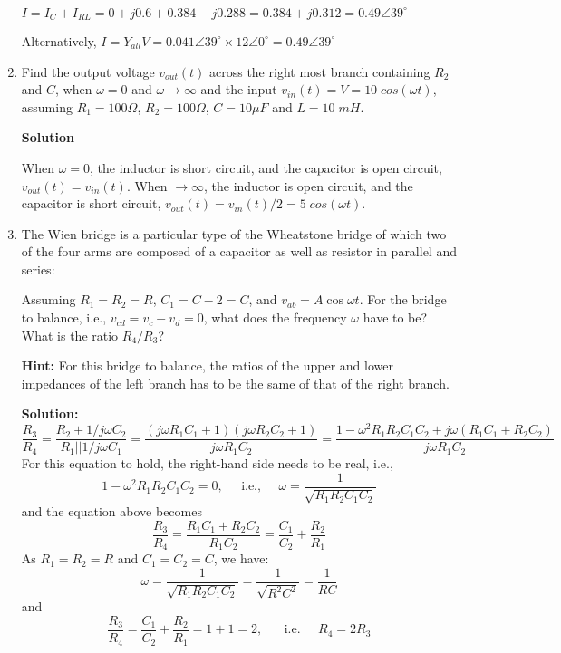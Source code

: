 \begin{enumerate}
$I=I_C+I_{RL}=0+j0.6+0.384-j0.288=0.384+j0.312=0.49\angle{39^\circ}$

Alternatively,
$I=Y_{all}V=0.041\angle{39^\circ} \times 12\angle{0^\circ}=0.49\angle{39^\circ}$


\item Find the output voltage $v_{out}(t)$ across the right most branch
containing $R_2$ and $C$, when $\omega=0$ and $\omega\rightarrow \infty$ 
and the input $v_{in}(t)=V=10\;cos(\omega t)$, assuming $R_1=100\Omega$, 
$R_2=100\Omega$, $C=10\mu F$ and $L=10\;mH$.


 {\bf Solution}
 
 When $\omega=0$, the inductor is short circuit, and the capacitor is open
 circuit, $v_{out}(t)=v_{in}(t)$. When $\rightarrow \infty$, the inductor is 
 open circuit, and the capacitor is  short circuit, $v_{out}(t)=v_{in}(t)/2=5
 \;cos(\omega t)$.

\item The Wien bridge is a particular type of the Wheatstone bridge 
  of which two of the four arms are composed of a capacitor as well 
  as resistor in parallel and series:


  Assuming $R_1=R_2=R$, $C_1=C-2=C$, and $v_{ab}=A\cos\omega t$. For the
  bridge to balance, i.e., $v_{cd}=v_c-v_d=0$, what does the frequency 
  $\omega$ have to be? What is the ratio $R_4/R_3$?

  {\bf Hint:} For this bridge to balance, the ratios of the upper and
  lower impedances of the left branch has to be the same of that of
  the right branch.

 {\bf Solution:}
 \[
 \frac{R_3}{R_4}=\frac{R_2+1/j\omega C_2}{R_1||1/j\omega C_1}
 =\frac{(j\omega R_1C_1+1)(j\omega R_2C_2+1)}{j\omega R_1C_2}
 =\frac{1-\omega^2R_1R_2C_1C_2+j\omega(R_1C_1+R_2C_2)}{j\omega R_1C_2}
 \]
 For this equation to hold, the right-hand side needs to be real, i.e., 
 \[
 1-\omega^2R_1R_2C_1C_2=0,\;\;\;\;\;\mbox{i.e.,}\;\;\;\;\;
 \omega=\frac{1}{\sqrt{R_1R_2C_1C_2}}
 \]
 and the equation above becomes 
 \[
 \frac{R_3}{R_4}=\frac{R_1C_1+R_2C_2}{R_1C_2}=\frac{C_1}{C_2}+\frac{R_2}{R_1}
 \]
 As $R_1=R_2=R$ and $C_1=C_2=C$, we have: 
 \[
 \omega=\frac{1}{\sqrt{R_1R_2C_1C_2}}=\frac{1}{\sqrt{R^2C^2}}=\frac{1}{RC}
 \]
 and 
 \[
 \frac{R_3}{R_4}=\frac{C_1}{C_2}+\frac{R_2}{R_1}=1+1=2,
 \;\;\;\;\;\;\mbox{i.e.}\;\;\;\;\;R_4=2R_3
 \]


\end{enumerate}



